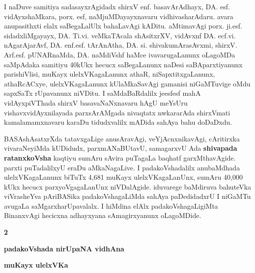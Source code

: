 \medskip

I naDuve samitiya sadasayxrAgidadx shirxV enf. basavArAdhayx, DA. esf. vidAyxshaMkara, porx. esf, naMjuMDayayxnavaru vidhivasha\-rAdaru. avara anupa\-sithxti elalx saBegaLalUlx bahaLavAgi kADitu. aMtimavAgi porx. ji.esf. sidadxliMgayayx, DA. Ti.vi. veMkaTAcala shAsitxrXV, vidAvxnf DA. ecf.vi. nAgarAjarAvf, DA. enf.esf. tArAnAtha, DA. si. shivakumArasAvxmi, shirxV. Arf.esf. \hbox{pUNARnaMda}, DA. naMdiVshf haMce ivavaru\-gaLanunx oLagoMDa saMpAdaka samitiyu 40kUkx hecucx saBe\-gaLanunx naDesi saBA\-parxtiyanunx parishiVlisi, muKayx ulelxVKagaLanunx athaR, niSapxtitxgaLanunx, athaRcACxye, ulelxVKagaLanunx kUlaMkaSavAgi gamanisi niGaMTu\-vige oMdu sapxSaTx rUpavanunx niVDitu. I saMdaBaRdalilx je{esf}{esf} mahA vidAyxpiVThada shirxV basavaNaNxnavaru hAgU \hbox{meYsUru} vishavxvidAyxnilayada parxsArAMgada nivaqtatx nwkararAda shirxVmati kamalamamxnavaru karaDu tidudxvalilx mADida sahAya bahu doDaDxdu.

\medskip

BASAshAsatxrXda tatavxgaLige anusAravAgi, veYjAcnxnikavAgi, cAritirxka vivaraNeyiMda kUDidudx, parxmANaBUtavU, samagarxvU Ada \textbf{shivapada ratanxkoVsha} kaqtiyu sumAru sAvira puTagaLa baqhatf garxMthavAgide. parxti puTadalilxyU eraDu aMkaNagaLive. I padakoVshadalilx anubaMdhada ulelxVKagaLanunx biTuTx 4,681 muKayx ulelxVKagaLanUnx, sumAru 40,000 kUkx hecucx parxyoVga\-gaLanUnx niVDalAgide. iduvarege baMdiruva bahuteVka viVrasheYva pAriBASika padakoVshagaLiMda sahAya paDedidadxrU I niGaMTu avugaLa saMgarxharUpa\-valalx. I hiMdina elAlx padakoVshagaLigiMta BinanxvAgi hecicxna adhayxyana sAmagirxyanunx oLagoMDide. 

\newpage

\begin{center}
{\large\bfseries 2}
\bigskip

{\Large\bf padakoVshada nirUpaNA vidhAna}

\bigskip

{\large\bf muKayx ulelxVKa}
\end{center}

